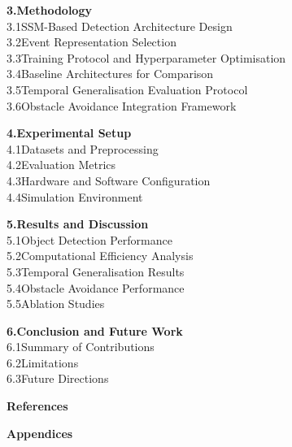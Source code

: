 \documentclass[11pt, a4paper]{report}
\begin{document}
\noindent\textbf{3.\quad Methodology}\\[3pt]
\hspace*{2em}3.1\quad SSM-Based Detection Architecture Design\\[2pt]
\hspace*{2em}3.2\quad Event Representation Selection\\[2pt]
\hspace*{2em}3.3\quad Training Protocol and Hyperparameter Optimisation\\[2pt]
\hspace*{2em}3.4\quad Baseline Architectures for Comparison\\[2pt]
\hspace*{2em}3.5\quad Temporal Generalisation Evaluation Protocol\\[2pt]
\hspace*{2em}3.6\quad Obstacle Avoidance Integration Framework

\bigskip

\noindent\textbf{4.\quad Experimental Setup}\\[3pt]
\hspace*{2em}4.1\quad Datasets and Preprocessing\\[2pt]
\hspace*{2em}4.2\quad Evaluation Metrics\\[2pt]
\hspace*{2em}4.3\quad Hardware and Software Configuration\\[2pt]
\hspace*{2em}4.4\quad Simulation Environment

\bigskip

\noindent\textbf{5.\quad Results and Discussion}\\[3pt]
\hspace*{2em}5.1\quad Object Detection Performance\\[2pt]
\hspace*{2em}5.2\quad Computational Efficiency Analysis\\[2pt]
\hspace*{2em}5.3\quad Temporal Generalisation Results\\[2pt]
\hspace*{2em}5.4\quad Obstacle Avoidance Performance\\[2pt]
\hspace*{2em}5.5\quad Ablation Studies

\bigskip

\noindent\textbf{6.\quad Conclusion and Future Work}\\[3pt]
\hspace*{2em}6.1\quad Summary of Contributions\\[2pt]
\hspace*{2em}6.2\quad Limitations\\[2pt]
\hspace*{2em}6.3\quad Future Directions

\bigskip

\noindent\textbf{References}

\bigskip

\noindent\textbf{Appendices}



\end{document}
